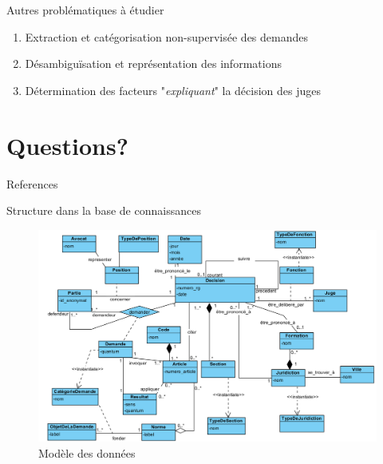 \documentclass[newPxFont,pagenumber]{beamer}
\begin{document}
\begin{frame}[c]{Autres problématiques à étudier}
\begin{enumerate}
\setlength\itemsep{2em}
\item Extraction et catégorisation non-supervisée des demandes 
\item Désambiguïsation et représentation des informations
\item Détermination des facteurs "\textit{expliquant}" la décision des juges
\end{enumerate}

\end{frame}


\section{Questions?}
\begin{frame}[t,allowframebreaks]{References}
\tiny

	
\end{frame}

\begin{frame}{Structure dans la base de connaissances}
\begin{figure}
\includegraphics[width=0.8\paperwidth]{class-diagram.png}
\caption{Modèle des données}
\end{figure}
\end{frame}
\end{document}
